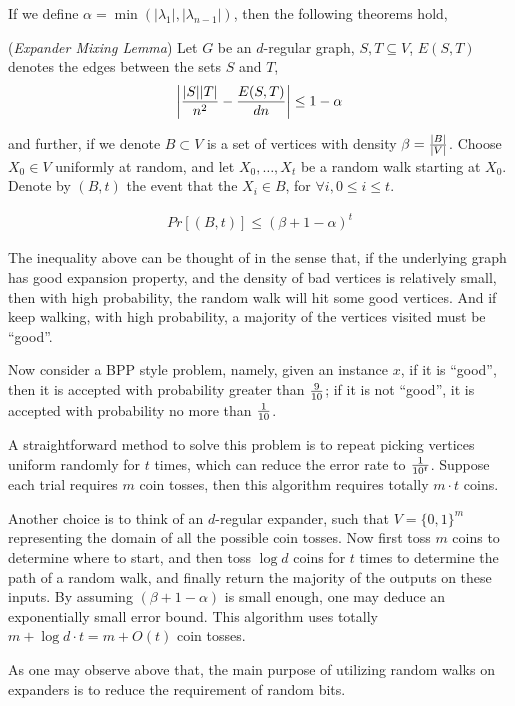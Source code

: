 
If we define $\alpha=\min{(|\lambda_1|,|\lambda_{n-1}|)}$, then the
following theorems hold,

\begin{theorem}(\emph{Expander Mixing Lemma})
Let $G$ be an $d$-regular graph, $S,T\subseteq V$, $E(S,T)$ denotes
the edges between the sets $S$ and $T$,
\begin{eqnarray*}
\left|{|S||T|\over n^2}-{E(S,T)\over dn}\right|\le 1-\alpha
\end{eqnarray*}
\end{theorem}

and further, if we denote $B\subset V$ is a set of vertices with
density $\beta={|B|\over|V|}$. Choose $X_0\in V$ uniformly at
random, and let $X_0,\dots,X_t$ be a random walk starting at $X_0$.
Denote by $(B,t)$ the event that the $X_i\in B$, for $\forall i,
0\le i\le t$.

\begin{theorem}
\begin{eqnarray*}
Pr[(B,t)]\le(\beta+1-\alpha)^t
\end{eqnarray*}
\end{theorem}

The inequality above can be thought of in the sense that, if the
underlying graph has good expansion property, and the density of bad
vertices is relatively small, then with high probability, the random
walk will hit some good vertices. And if keep walking, with high
probability, a majority of the vertices visited must be ``good''.

Now consider a BPP style problem, namely, given an instance $x$, if
it is ``good'', then it is accepted with probability greater than
$9\over 10$; if it is not ``good'', it is accepted with probability
no more than $1\over 10$.

A straightforward method to solve this problem is to repeat picking
vertices uniform randomly for $t$ times, which can reduce the error
rate to ${1\over 10^t}$. Suppose each trial requires $m$ coin
tosses, then this algorithm requires totally $m\cdot t$ coins.

Another choice is to think of an $d$-regular expander, such that
$V=\{0,1\}^m$ representing the domain of all the possible coin
tosses. Now first toss $m$ coins to determine where to start, and
then toss $\log{d}$ coins for $t$ times to determine the path of a
random walk, and finally return the majority of the outputs on these
inputs. By assuming $(\beta+1-\alpha)$ is small enough, one may
deduce an exponentially small error bound. This algorithm uses
totally $m+\log{d}\cdot t=m+O(t)$ coin tosses.

As one may observe above that, the main purpose of utilizing random
walks on expanders is to reduce the requirement of random bits.

